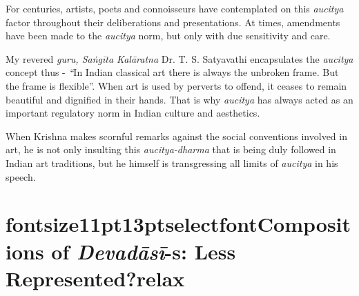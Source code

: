 For centuries, artists, poets and connoisseurs have contemplated on this \textit{aucitya} factor throughout their deliberations and presentations. At times, amendments have been made to the \textit{aucitya} norm, but only with due sensitivity and care.

My revered \textit{guru, Saṅgīta Kalāratna} Dr. T. S. Satyavathi encapsulates the \textit{aucitya} concept thus - \textit{“}In Indian classical art there is always the unbroken frame. But the frame is flexible”. When art is used by perverts to offend, it ceases to remain beautiful and dignified in their hands. That is why \textit{aucitya} has always acted as an important regulatory norm in Indian culture and aesthetics.

When Krishna makes scornful remarks against the social conventions involved in art, he is not only insulting this \textit{aucitya-dharma} that is being duly followed in Indian art traditions, but he himself is transgressing all limits of \textit{aucitya} in his speech.

\vspace{-.3cm}

\section*{fontsize{11pt}{13pt}selectfontCompositions of \textit{Devadāsī}-s: Less Represented?relax}

